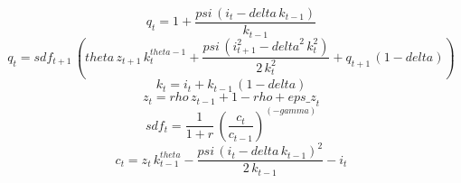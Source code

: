 \begin{dmath}
{q}_{t}=1+\frac{{psi}\, \left({i}_{t}-{delta}\, {k}_{t-1}\right)}{{k}_{t-1}}
\end{dmath}
\begin{dmath}
{q}_{t}={sdf}_{t+1}\, \left({theta}\, {z}_{t+1}\, {k}_{t}^{{theta}-1}+\frac{{psi}\, \left({i}_{t+1}^{2}-{delta}^{2}\, {k}_{t}^{2}\right)}{2\, {k}_{t}^{2}}+{q}_{t+1}\, \left(1-{delta}\right)\right)
\end{dmath}
\begin{dmath}
{k}_{t}={i}_{t}+{k}_{t-1}\, \left(1-{delta}\right)
\end{dmath}
\begin{dmath}
{z}_{t}={rho}\, {z}_{t-1}+1-{rho}+{eps\_z}_{t}
\end{dmath}
\begin{dmath}
{sdf}_{t}=\frac{1}{1+{r}}\, \left(\frac{{c}_{t}}{{c}_{t-1}}\right)^{\left(-{gamma}\right)}
\end{dmath}
\begin{dmath}
{c}_{t}={z}_{t}\, {k}_{t-1}^{{theta}}-\frac{{psi}\, \left({i}_{t}-{delta}\, {k}_{t-1}\right)^{2}}{2\, {k}_{t-1}}-{i}_{t}
\end{dmath}

